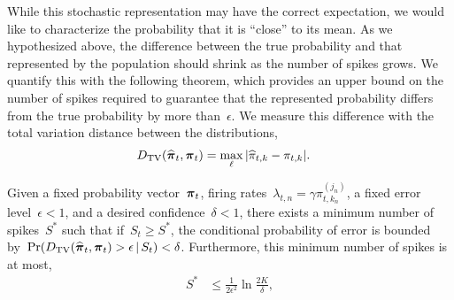 While this stochastic representation may have the correct expectation, we
would like to characterize the probability that it is ``close'' to its
mean. As we hypothesized above, the difference between the true
probability and that represented by the population should shrink as
the number of spikes grows. We quantify this with the following
theorem, which provides an upper bound on the number of spikes
required to guarantee that the represented probability differs from
the true probability by more than~$\epsilon$. We measure this
difference with the total variation distance between the
distributions,
\begin{align}
  {D_{\mathrm{TV}}}(\widehat{\boldsymbol{\pi}}_t, \boldsymbol{\pi}_t) &= 
  \max_{\ell} |\widehat{\pi}_{t,k} - \pi_{t,k}|.
\end{align}

\begin{theorem}
Given a fixed probability vector~$\boldsymbol{\pi}_t$,
firing rates~$\lambda_{t,n} = \gamma \pi_{t,k_n}^{(j_n)}$, a fixed 
error level~$\epsilon < 1$, and a desired confidence~$\delta < 1$, 
there exists a minimum number of spikes~$S^*$ such that if~$S_t \geq S^*$,
the conditional probability of error is bounded 
by~$\Pr({D_{\mathrm{TV}}}(\widehat{\boldsymbol{\pi}}_t, \boldsymbol{\pi}_t) > \epsilon \,|\, S_t) < \delta$.
Furthermore, this minimum number of spikes is at most,
\begin{align}
S^* &\leq \frac{1}{2\epsilon^2} \ln \frac{2K}{\delta},  
\end{align}
\end{theorem}

